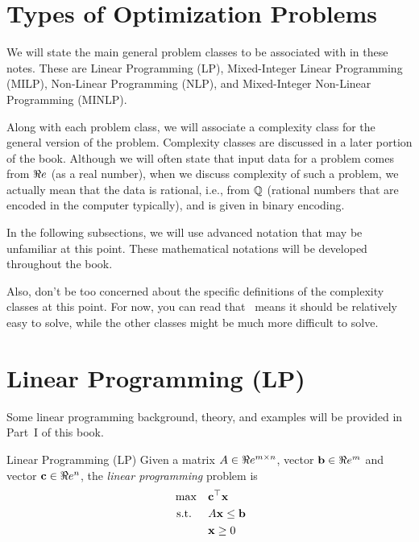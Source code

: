 \section{Types of Optimization Problems}
\label{sec:types-of-optimization}
We will state the main general problem classes to be associated with in these notes.  These are Linear Programming (LP), Mixed-Integer Linear Programming (MILP), Non-Linear Programming (NLP), and Mixed-Integer Non-Linear Programming (MINLP).  

\begin{center}
\par{}\label{fig:tree-diagram-types}%

\end{center}

Along with each problem class, we will associate a complexity class for the general version of the problem.  Complexity classes are discussed in a later portion of the book.  Although we will often state that input data for a problem comes from $\Re e$ (as a real number), when we discuss complexity of such a problem, we actually mean that the data is rational, i.e., from $\mathbb{Q}$ (rational numbers that are encoded in the computer typically), and is given in binary encoding.

\begin{warn}
In the following subsections, we will use advanced notation that may be unfamiliar at this point.  These mathematical notations will be developed throughout the book.

Also, don't be too concerned about the specific definitions of the complexity classes at this point.  For now, you can read that \polynomial\ means it should be relatively easy to solve, while the other classes might be much more difficult to solve.
\end{warn}

\section{Linear Programming (LP)}
\label{sec:intro-LP}

Some linear programming background, theory, and examples will be provided in Part~I of this book.
\begin{general}{Linear Programming (LP)}{\polynomial}
\label{general:LP}
Given a matrix $A \in \Re e^{m\times n}$, vector $\mathbf{b} \in \Re e^m$ and vector $\mathbf{c} \in \Re e^n$, the \emph{linear programming} problem is
\begin{equation}
\label{eq:LP}
\begin{split}
\max \quad & \mathbf{c}^\top \mathbf{x}\\
\mbox{ s.t. }  \quad & A\mathbf{x} \leq \mathbf{b}\\
& \mathbf{x} \geq 0
\end{split}
\end{equation}
\end{general}

